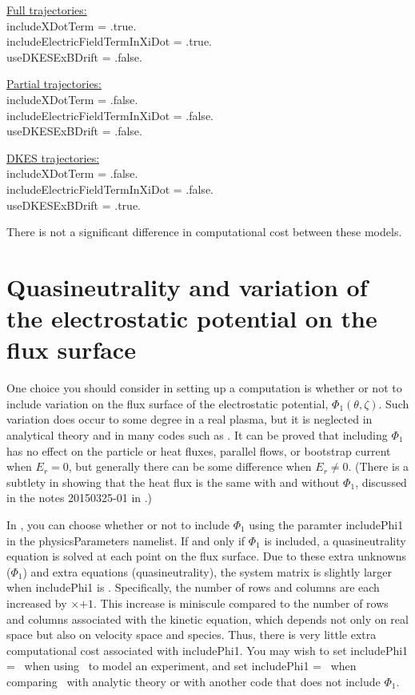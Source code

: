 {\setlength{\parindent}{0cm}

\underline{Full trajectories:}\\
{\ttfamily 
includeXDotTerm = .true.\\
includeElectricFieldTermInXiDot = .true.\\
useDKESExBDrift = .false.\\
}

\underline{Partial trajectories:}\\
{\ttfamily
includeXDotTerm = .false.\\
includeElectricFieldTermInXiDot = .false.\\
useDKESExBDrift = .false.\\
}

\underline{DKES trajectories:}\\
{\ttfamily
includeXDotTerm = .false.\\
includeElectricFieldTermInXiDot = .false.\\
useDKESExBDrift = .true.\\
}
}

There is not a significant difference in computational cost between these models.


\section{Quasineutrality and variation of the electrostatic potential on the flux surface}

One choice you should consider in setting up a computation is whether or not
to include variation on the flux surface of the electrostatic potential, $\Phi_1(\theta,\zeta)$.
Such variation does occur to some degree in a real plasma, but it is 
neglected in analytical theory and in many codes such as \dkes.  It can be proved
that including $\Phi_1$ has no effect on the particle or heat fluxes, parallel flows, or bootstrap current
when $E_r=0$, but generally there can be some difference when $E_r \ne 0$.
(There is a subtlety in showing that the heat flux is the same with and without $\Phi_1$,
discussed in the notes 20150325-01 in .)

In \sfincs, you can choose whether or not to
include $\Phi_1$ using the paramter {\ttfamily includePhi1} in the {\ttfamily physicsParameters}
namelist.  If and only if $\Phi_1$ is included, a quasineutrality equation is solved
at each point on the flux surface.  Due to these extra unknowns ($\Phi_1$) and extra equations
(quasineutrality), the system matrix is slightly larger when {\ttfamily includePhi1} is \true.
Specifically, the number of rows and columns are each increased by \Ntheta$\times$\Nzeta$+1$.  This increase is miniscule compared
to the number of rows and columns associated with the kinetic equation, which depends not only on real space
but also on velocity space and species.  Thus, there is very little extra computational cost associated
with {\ttfamily includePhi1}.  You may wish to set {\ttfamily includePhi1} = \true~when
using \sfincs~to model an experiment, and set  {\ttfamily includePhi1} = \false~when
comparing \sfincs~with analytic theory or with another code that does not include $\Phi_1$.

